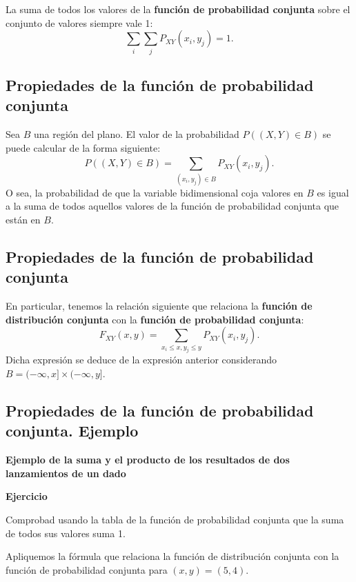 \documentclass[]{book}
\begin{document}
La suma de todos los valores de la \textbf{función de probabilidad conjunta} sobre el conjunto de valores siempre vale 1: \[\sum_{i}\sum_j P_{XY}(x_i,y_j)=1.\]

\hypertarget{propiedades-de-la-funciuxf3n-de-probabilidad-conjunta-1}{%
\subsection{Propiedades de la función de probabilidad conjunta}\label{propiedades-de-la-funciuxf3n-de-probabilidad-conjunta-1}}

Sea \(B\) una región del plano. El valor de la probabilidad \(P((X,Y)\in B)\) se puede calcular de la forma siguiente:
\[
P((X,Y)\in B) =\sum_{(x_i,y_j)\in B} P_{XY}(x_i,y_j).
\]
O sea, la probabilidad de que la variable bidimensional coja valores en \(B\) es igual a la suma de todos aquellos valores de la función de probabilidad conjunta que están en \(B\).

\hypertarget{propiedades-de-la-funciuxf3n-de-probabilidad-conjunta-2}{%
\subsection{Propiedades de la función de probabilidad conjunta}\label{propiedades-de-la-funciuxf3n-de-probabilidad-conjunta-2}}

En particular, tenemos la relación siguiente que relaciona la \textbf{función de distribución conjunta} con la \textbf{función de probabilidad conjunta}:
\[
F_{XY}(x,y)=\sum_{x_i\leq x, y_j\leq y} P_{XY}(x_i,y_j).
\]
Dicha expresión se deduce de la expresión anterior considerando \(B=(-\infty,x]\times (-\infty,y]\).

\hypertarget{propiedades-de-la-funciuxf3n-de-probabilidad-conjunta.-ejemplo}{%
\subsection{Propiedades de la función de probabilidad conjunta. Ejemplo}\label{propiedades-de-la-funciuxf3n-de-probabilidad-conjunta.-ejemplo}}

\textbf{Ejemplo de la suma y el producto de los resultados de dos lanzamientos de un dado}

\textbf{Ejercicio}

Comprobad usando la tabla de la función de probabilidad conjunta que la suma de todos sus valores suma 1.

Apliquemos la fórmula que relaciona la función de distribución conjunta con la función de probabilidad conjunta para \((x,y)=(5,4)\).
\end{document}
